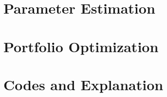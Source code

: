 \documentclass[twoside]{article}
\theoremstyle{plain} %
\theoremstyle{definition} %
\theoremstyle{remark} %
\begin{document}
\newpage
\section{Parameter Estimation}



\newpage
\section{Portfolio Optimization}



\newpage
\section*{Codes and Explanation}



\end{document}
